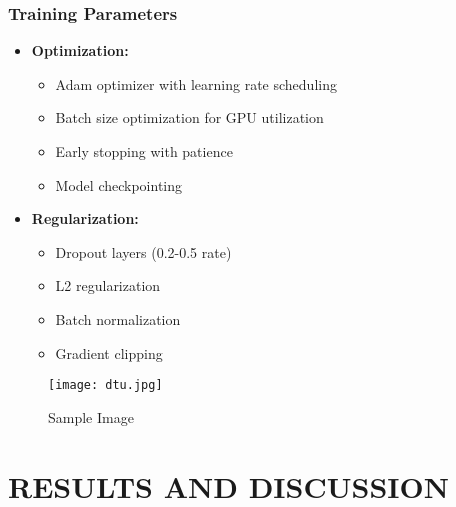 \documentclass[12pt,a4paper]{report}
\begin{document}
\subsection{Training Parameters}
\begin{itemize}
\item \textbf{Optimization:}
  \begin{itemize}
    \item Adam optimizer with learning rate scheduling
    \item Batch size optimization for GPU utilization
    \item Early stopping with patience
    \item Model checkpointing
  \end{itemize}

\item \textbf{Regularization:}
  \begin{itemize}
    \item Dropout layers (0.2-0.5 rate)
    \item L2 regularization
    \item Batch normalization
    \item Gradient clipping
  \end{itemize}
\end{itemize}
\begin{figure}[H]
    \centering
    \texttt{[image: dtu.jpg]}
    \caption{Sample Image}
    \label{fig:sample image}
\end{figure}

\begin{table}[htbp]
\caption{Sample Table}
\vspace{0.5cm}
\end{table}


\chapter{RESULTS AND DISCUSSION}
\end{document}

